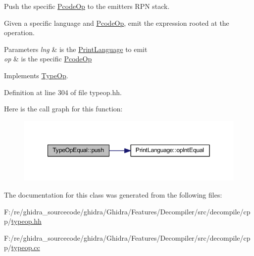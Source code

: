 Push the specific \mbox{\hyperlink{class_pcode_op}{Pcode\+Op}} to the emitter\textquotesingle{}s R\+PN stack. 

Given a specific language and \mbox{\hyperlink{class_pcode_op}{Pcode\+Op}}, emit the expression rooted at the operation. 
\begin{DoxyParams}{Parameters}
{\em lng} & is the \mbox{\hyperlink{class_print_language}{Print\+Language}} to emit \\
\hline
{\em op} & is the specific \mbox{\hyperlink{class_pcode_op}{Pcode\+Op}} \\
\hline
\end{DoxyParams}


Implements \mbox{\hyperlink{class_type_op_ac9c9544203ed74dabe6ac662b653b2af}{Type\+Op}}.



Definition at line 304 of file typeop.\+hh.

Here is the call graph for this function\+:
\nopagebreak
\begin{figure}[H]
\begin{center}
\leavevmode
\includegraphics[width=349pt]{class_type_op_equal_a77801a9716663c07bca5f040e793275f_cgraph}
\end{center}
\end{figure}


The documentation for this class was generated from the following files\+:\begin{DoxyCompactItemize}
\item 
F\+:/re/ghidra\+\_\+sourcecode/ghidra/\+Ghidra/\+Features/\+Decompiler/src/decompile/cpp/\mbox{\hyperlink{typeop_8hh}{typeop.\+hh}}\item 
F\+:/re/ghidra\+\_\+sourcecode/ghidra/\+Ghidra/\+Features/\+Decompiler/src/decompile/cpp/\mbox{\hyperlink{typeop_8cc}{typeop.\+cc}}\end{DoxyCompactItemize}
